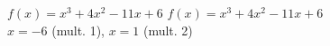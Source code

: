 {$f(x) = x^{3} + 4x^{2} - 11x + 6$}
{$f(x) = x^{3} + 4x^{2} - 11x + 6$ \\ $x = -6$ (mult. 1), $x = 1$ (mult. 2)}